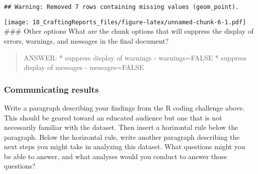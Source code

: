 \documentclass[]{article}
\newenvironment{Shaded}{\begin{snugshade}}{\end{snugshade}}
\newcommand{\DataTypeTok}[1]{\textcolor[rgb]{0.13,0.29,0.53}{#1}}
\newcommand{\KeywordTok}[1]{\textcolor[rgb]{0.13,0.29,0.53}{\textbf{#1}}}
\newcommand{\NormalTok}[1]{#1}
\newcommand{\OperatorTok}[1]{\textcolor[rgb]{0.81,0.36,0.00}{\textbf{#1}}}
\newcommand{\StringTok}[1]{\textcolor[rgb]{0.31,0.60,0.02}{#1}}
\begin{document}
\begin{Shaded}
\end{Shaded}

\begin{verbatim}
## Warning: Removed 7 rows containing missing values (geom_point).
\end{verbatim}

\texttt{[image: 18\_CraftingReports\_files/figure-latex/unnamed-chunk-6-1.pdf]}
\#\#\# Other options What are the chunk options that will suppress the
display of errors, warnings, and messages in the final document?

\begin{quote}
ANSWER: * suppress display of warnings - warnings=FALSE * suppress
display of messages - messages=FALSE
\end{quote}

\hypertarget{communicating-results}{%
\subsubsection{Communicating results}\label{communicating-results}}

Write a paragraph describing your findings from the R coding challenge
above. This should be geared toward an educated audience but one that is
not necessarily familiar with the dataset. Then insert a horizontal rule
below the paragraph. Below the horizontal rule, write another paragraph
describing the next steps you might take in analyzing this dataset. What
questions might you be able to answer, and what analyses would you
conduct to answer those questions?
\end{document}
